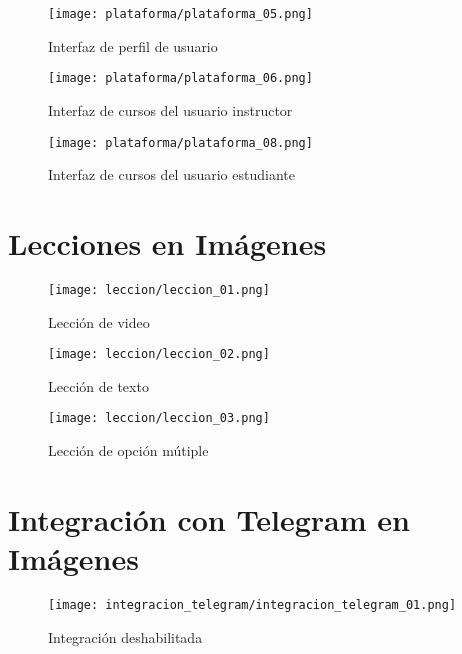 \begin{figure}[H]
    \centering
    \texttt{[image: plataforma/plataforma\_05.png]}
    \caption{Interfaz de perfil de usuario}
    \label{fig:interfaz_sistema_perfil_usuario}
\end{figure}

\begin{figure}[H]
    \centering
    \texttt{[image: plataforma/plataforma\_06.png]}
    \caption{Interfaz de cursos del usuario instructor}
    \label{fig:interfaz_sistema_cursos_usuario_instructor}
\end{figure}

\begin{figure}[H]
    \centering
    \texttt{[image: plataforma/plataforma\_08.png]}
    \caption{Interfaz de cursos del usuario estudiante}
    \label{fig:interfaz_sistema_cursos_usuario_estudiante}
\end{figure}


\section{Lecciones en Imágenes}

\begin{figure}[H]
    \centering
    \texttt{[image: leccion/leccion\_01.png]}
    \caption{Lección de video}
    \label{fig:leccion_video}
\end{figure}

\begin{figure}[H]
    \centering
    \texttt{[image: leccion/leccion\_02.png]}
    \caption{Lección de texto}
    \label{fig:leccion_texto}
\end{figure}

\begin{figure}[H]
    \centering
    \texttt{[image: leccion/leccion\_03.png]}
    \caption{Lección de opción mútiple}
    \label{fig:leccion_opcion_multiple}
\end{figure}

\section{Integración con Telegram en Imágenes}

\begin{figure}[H]
    \centering
    \texttt{[image: integracion\_telegram/integracion\_telegram\_01.png]}
    \caption{Integración deshabilitada}
    \label{fig:integracion_telegram_deshabilitada}
\end{figure}

